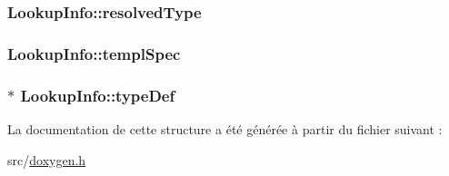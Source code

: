 \subsubsection[{resolved\+Type}]{ Lookup\+Info\+::resolved\+Type}\label{struct_lookup_info_a55af5dfe2282dcc19615ac1e0ace76ff}
\hypertarget{struct_lookup_info_ab6109313beafe89f7d42431f8da344fb}{}
\subsubsection[{templ\+Spec}]{ Lookup\+Info\+::templ\+Spec}\label{struct_lookup_info_ab6109313beafe89f7d42431f8da344fb}
\hypertarget{struct_lookup_info_a4d3180e6758e0a88e96f6ec5f80c07ec}{}
\subsubsection[{type\+Def}]{$\ast$ Lookup\+Info\+::type\+Def}\label{struct_lookup_info_a4d3180e6758e0a88e96f6ec5f80c07ec}


La documentation de cette structure a été générée à partir du fichier suivant \+:\begin{DoxyCompactItemize}
\item 
src/\hyperlink{doxygen_8h}{doxygen.\+h}\end{DoxyCompactItemize}
